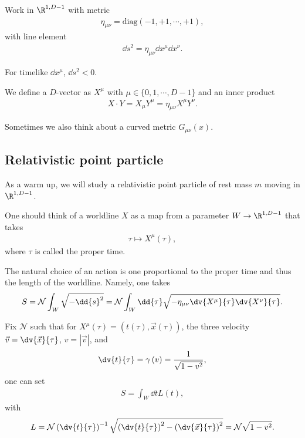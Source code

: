 
Work in $\R^{1, D - 1}$ with metric
\begin{align}
    \eta_{\mu \nu} = \text{diag}\left( -1,+1,\cdots,+1 \right) 
,\end{align}
with line element
\begin{align}
    \dd{s}^2 = \eta_{\mu \nu} \dd{x}^{\mu} \dd{x}^{\nu}
.\end{align}

For timelike $\dd{x}^{\mu}$, $\dd{s}^2 < 0$.

We define a $D$-vector as $X^{\mu}$ with $\mu \in \{0,1,\cdots, D -1\} $ and an inner product
\begin{align}
    X \cdot Y = X_\mu Y^{\mu} = \eta_{\mu \nu} X^{\mu} Y^{\nu}
.\end{align}

Sometimes we also think about a curved metric $G_{\mu \nu}\left( x \right) $.

\subsection{Relativistic point particle}

As a warm up, we will study a relativistic point particle of rest mass $m$ moving in $\R^{1, D-1}$.

One should think of a worldline $X$ as a map from a parameter $W \to \R^{1, D - 1}$ that takes
\begin{align}
    \tau \mapsto X^{\mu}\left( \tau \right)
,\end{align}
where $\tau$ is called the proper time.

The natural choice of an action is one proportional to the proper time and thus the length of the worldline. Namely, one takes
\begin{align}
    S = \mathcal{N} \int_{W} \sqrt{-\dd{s}^2}  = \mathcal{N} \int_W \dd{\tau} \sqrt{-\eta_{\mu \nu} \dv{X^{\mu}}{\tau} \dv{X^{\nu}}{\tau}} 
.\end{align}

\begin{exercise}
    Fix $\mathcal{N}$ such that for $X^{\mu}\left( \tau \right) = \left( t \left( \tau \right) , \vec{x}\left( \tau \right)  \right) $, the three velocity $\vec{v} = \dv{\vec{x}}{\tau}$, $v = \left| \vec{v} \right| $, and 
    \begin{align}
        \dv{t}{\tau} = \gamma \left( v \right) = \frac{1}{\sqrt{1 - v^2} }
    ,\end{align}
    one can set
    \begin{align}
        S = \int_W \dd{t} L \left( t \right) 
    ,\end{align}
    with
    \begin{align}
        L = \mathcal{N} \left( \dv{t}{\tau} \right)^{-1} \sqrt{\left( \dv{t}{\tau} \right)^2 - \left( \dv{\vec{x}}{\tau} \right)^2 } = \mathcal{N} \sqrt{1 - v^2} 
    .\end{align}
\end{exercise}

